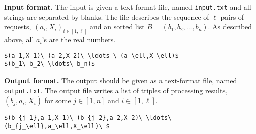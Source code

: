 \documentclass{article}
\begin{document}
\bigskip
\noindent\textbf{Input format.} %
The input is given a text-format file, named \texttt{input.txt} and all strings are separated by blanks.
The file  describes the sequence of $\ell$ pairs of requests, $(a_i,X_i)_{i\in[1,\ell]}$ and an sorted list $B=(b_1,b_2,\ldots,b_n)$.
As described above, all $a_i$'s are the real numbers.



\begin{lstlisting}[backgroundcolor=\color{yellow!40}]
$(a_1,X_1)\ (a_2,X_2)\ \ldots \ (a_\ell,X_\ell)$ 
$(b_1\ b_2\ \ldots\ b_n)$
\end{lstlisting}



\bigskip
\noindent\textbf{Output format.} %
The output should be given as a text-format file, named \texttt{output.txt}.
The output file writes a list of triples of processing results, $(b_j,a_i,X_i)$ for 
some $j\in[1,n]$ and $i\in[1,\ell]$.


\begin{lstlisting}[backgroundcolor=\color{yellow!40}]
$(b_{j_1},a_1,X_1)\ (b_{j_2},a_2,X_2)\ \ldots\ (b_{j_\ell},a_\ell,X_\ell)\ $
\end{lstlisting}
\end{document}
